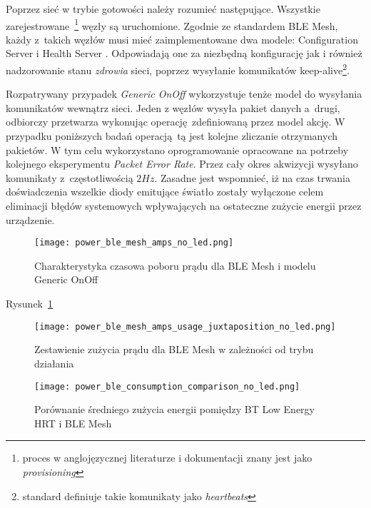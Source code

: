 Poprzez sieć w trybie gotowości należy rozumieć następujące. Wszystkie zarejestrowane~\footnote{proces w anglojęzycznej literaturze i dokumentacji znany jest jako \textit{provisioning}} węzły są uruchomione. Zgodnie ze standardem BLE Mesh, każdy z~takich węzłów musi mieć zaimplementowane dwa modele:
Configuration Server i Health Server \cite{wooley_martin_bluetooth_2019}. Odpowiadają one za niezbędną konfigurację jak i również nadzorowanie stanu \textit{zdrowia} sieci, poprzez wysyłanie komunikatów keep-alive\footnote{standard definiuje takie komunikaty jako \textit{heartbeats}\cite{wooley_martin_bluetooth_2019}\cite{mesh_working_group_mesh_2019}}.

Rozpatrywany przypadek \textit{Generic OnOff} wykorzystuje tenże model do wysyłania komunikatów wewnątrz sieci. Jeden z węzłów wysyła pakiet danych a~drugi, odbiorczy przetwarza wykonując operację zdefiniowaną przez model akcję. W przypadku poniższych badań operacją tą jest kolejne zliczanie
otrzymanych pakietów. W tym celu wykorzystano oprogramowanie opracowane na potrzeby kolejnego eksperymentu \textit{Packet Error Rate}.
Przez cały okres akwizycji wysyłano komunikaty z~częstotliwością $2Hz$. Zasadne jest wspomnieć, iż na czas trwania doświadczenia wszelkie 
diody emitujące światło zostały wyłączone celem eliminacji błędów systemowych wpływających na ostateczne zużycie energii przez
urządzenie.

\begin{figure}[!htb]
	\centering \texttt{[image: power\_ble\_mesh\_amps\_no\_led.png]} 
	\caption{Charakterystyka czasowa poboru prądu dla BLE Mesh i modelu Generic OnOff}
	\label{rys:power_ble_mesh_amps}
\end{figure}

Rysunek~\ref{rys:power_ble_mesh_amps}

\begin{figure}[!htb]
	\centering \texttt{[image: power\_ble\_mesh\_amps\_usage\_juxtaposition\_no\_led.png]} 
	\caption{Zestawienie zużycia prądu dla BLE Mesh w zależności od trybu działania}
	\label{rys:power_ble_mesh_amps_usage_juxtaposition}
\end{figure}

\begin{figure}[!htb]
	\centering \texttt{[image: power\_ble\_consumption\_comparison\_no\_led.png]} 
	\caption{Porównanie średniego zużycia energii pomiędzy BT Low Energy HRT i BLE Mesh}
	\label{rys:power_ble_consumption_comparison}
\end{figure}


